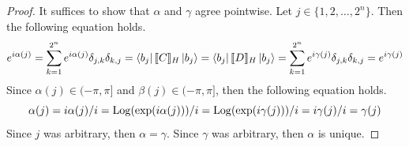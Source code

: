 \begin{proof}
    It suffices to show that $\alpha$ and $\gamma$ agree pointwise.
    Let $j \in \{ 1, 2, \ldots, 2^n \}$.
    Then the following equation holds.
    \begin{equation*}
        e^{i\alpha(j)}
        =
        \sum_{k=1}^{2^n} e^{i\alpha(j)} \delta_{j,k} \delta_{k,j}
        =
        \bra{b_j} \llbracket C\rrbracket_H \ket{b_j}
        =
        \bra{b_j} \llbracket D\rrbracket_H \ket{b_j}
        =
        \sum_{k=1}^{2^n} e^{i\gamma(j)} \delta_{j,k} \delta_{k,j}
        =
        e^{i\gamma(j)}
    \end{equation*}
    Since $\alpha(j) \in (-\pi,\pi]$ and $\beta(j) \in (-\pi,\pi]$, then the following equation holds.
    \begin{equation*}
        \alpha(j)
        =
        i\alpha(j)/i
        =
        \operatorname{Log}( \exp( i\alpha( j ) ) ) / i
        =
        \operatorname{Log}( \exp( i\gamma( j ) ) ) / i
        =
        i\gamma(j)/i
        =
        \gamma(j)
    \end{equation*}
    Since $j$ was arbitrary, then $\alpha = \gamma$.
    Since $\gamma$ was arbitrary, then $\alpha$ is unique.
\end{proof}
